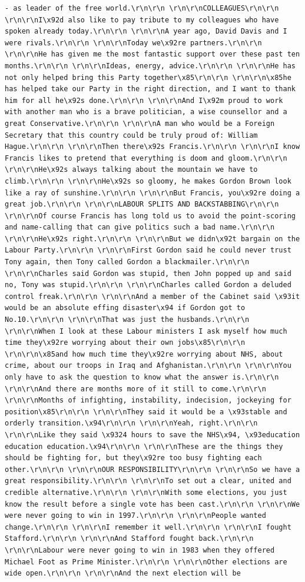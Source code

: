 \documentclass[
  letterpaper,
  DIV=11,
  numbers=noendperiod]{scrreprt}
\begin{document}
\begin{verbatim}
- as leader of the free world.\r\n\r\n \r\n\r\nCOLLEAGUES\r\n\r\n \r\n\r\nI\x92d also like to pay tribute to my colleagues who have spoken already today.\r\n\r\n \r\n\r\nA year ago, David Davis and I were rivals.\r\n\r\n \r\n\r\nToday we\x92re partners.\r\n\r\n \r\n\r\nHe has given me the most fantastic support over these past ten months.\r\n\r\n \r\n\r\nIdeas, energy, advice.\r\n\r\n \r\n\r\nHe has not only helped bring this Party together\x85\r\n\r\n \r\n\r\n\x85he has helped take our Party in the right direction, and I want to thank him for all he\x92s done.\r\n\r\n \r\n\r\nAnd I\x92m proud to work with another man who is a brave politician, a wise counsellor and a great Conservative.\r\n\r\n \r\n\r\nA man who would be a Foreign Secretary that this country could be truly proud of: William Hague.\r\n\r\n \r\n\r\nThen there\x92s Francis.\r\n\r\n \r\n\r\nI know Francis likes to pretend that everything is doom and gloom.\r\n\r\n \r\n\r\nHe\x92s always talking about the mountain we have to climb.\r\n\r\n \r\n\r\nHe\x92s so gloomy, he makes Gordon Brown look like a ray of sunshine.\r\n\r\n \r\n\r\nBut Francis, you\x92re doing a great job.\r\n\r\n \r\n\r\nLABOUR SPLITS AND BACKSTABBING\r\n\r\n \r\n\r\nOf course Francis has long told us to avoid the point-scoring and name-calling that can give politics such a bad name.\r\n\r\n \r\n\r\nHe\x92s right.\r\n\r\n \r\n\r\nBut we didn\x92t bargain on the Labour Party.\r\n\r\n \r\n\r\nFirst Gordon said he could never trust Tony again, then Tony called Gordon a blackmailer.\r\n\r\n \r\n\r\nCharles said Gordon was stupid, then John popped up and said no, Tony was stupid.\r\n\r\n \r\n\r\nCharles called Gordon a deluded control freak.\r\n\r\n \r\n\r\nAnd a member of the Cabinet said \x93it would be an absolute effing disaster\x94 if Gordon got to No.10.\r\n\r\n \r\n\r\nThat was just the husbands.\r\n\r\n \r\n\r\nWhen I look at these Labour ministers I ask myself how much time they\x92re worrying about their own jobs\x85\r\n\r\n \r\n\r\n\x85and how much time they\x92re worrying about NHS, about crime, about our troops in Iraq and Afghanistan.\r\n\r\n \r\n\r\nYou only have to ask the question to know what the answer is.\r\n\r\n \r\n\r\nAnd there are months more of it still to come.\r\n\r\n \r\n\r\nMonths of infighting, instability, indecision, jockeying for position\x85\r\n\r\n \r\n\r\nThey said it would be a \x93stable and orderly transition.\x94\r\n\r\n \r\n\r\nYeah, right.\r\n\r\n \r\n\r\nLike they said \x9324 hours to save the NHS\x94, \x93education education education.\x94\r\n\r\n \r\n\r\nThese are the things they should be fighting for, but they\x92re too busy fighting each other.\r\n\r\n \r\n\r\nOUR RESPONSIBILITY\r\n\r\n \r\n\r\nSo we have a great responsibility.\r\n\r\n \r\n\r\nTo set out a clear, united and credible alternative.\r\n\r\n \r\n\r\nWith some elections, you just know the result before a single vote has been cast.\r\n\r\n \r\n\r\nWe were never going to win in 1997.\r\n\r\n \r\n\r\nPeople wanted change.\r\n\r\n \r\n\r\nI remember it well.\r\n\r\n \r\n\r\nI fought Stafford.\r\n\r\n \r\n\r\nAnd Stafford fought back.\r\n\r\n \r\n\r\nLabour were never going to win in 1983 when they offered Michael Foot as Prime Minister.\r\n\r\n \r\n\r\nOther elections are wide open.\r\n\r\n \r\n\r\nAnd the next election will be 
\end{verbatim}
\end{document}
